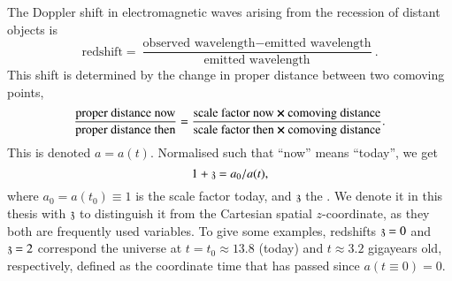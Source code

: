 

    The Doppler shift in electromagnetic waves arising from the recession of distant objects is %
    \begin{equation*}
        \text{redshift} = 
        \frac{\text{observed wavelength} - \text{emitted wavelength} }{\text{emitted wavelength} }.
    \end{equation*}
    This shift is determined by the change in proper distance between two comoving points, 
    \begin{equation*}
        \frac{\text{proper distance now}}{\text{proper distance then}} = \frac{\text{scale factor now}\cross \text{comoving distance}}{\text{scale factor then}\cross \text{comoving distance}}.
    \end{equation*}
    This  is denoted $a= a(t)$. Normalised such that ``now'' means ``today'', we get 
    \begin{equation}
        1 + \mathfrak{z} = a_0/a(t),
    \end{equation}
    where $a_0 = a(t_0)\equiv 1$ is the scale factor today, and $\mathfrak{z}$ the . 
    We denote it in this thesis with $\mathfrak{z}$ to distinguish it from the Cartesian spatial $z$-coordinate, as they both are frequently used variables. %
    To give some examples, redshifts $\mathfrak{z} = 0$ and $\mathfrak{z}=2$ correspond the universe at $t=t_0 \approx 13.8$ (today) and $t\approx 3.2$ gigayears old, respectively, defined as the coordinate time that has passed since $a(t\equiv 0)=0$.




